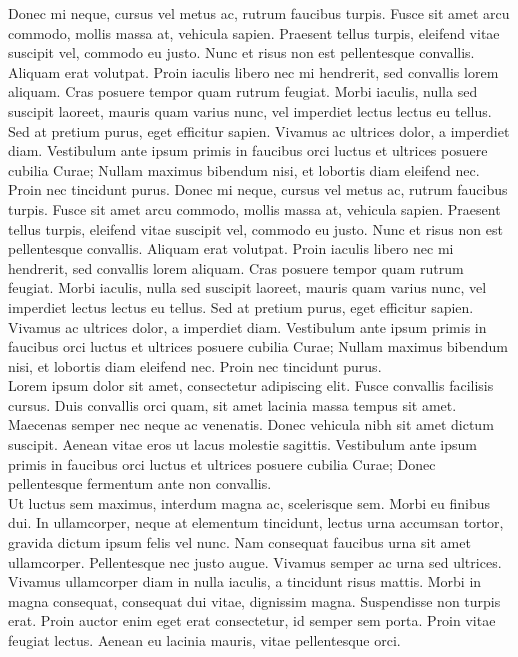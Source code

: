 Donec mi neque, cursus vel metus ac, rutrum faucibus turpis. Fusce sit amet arcu commodo, mollis massa at, vehicula sapien. Praesent tellus turpis, eleifend vitae suscipit vel, commodo eu justo. Nunc et risus non est pellentesque convallis. Aliquam erat volutpat. Proin iaculis libero nec mi hendrerit, sed convallis lorem aliquam. Cras posuere tempor quam rutrum feugiat. Morbi iaculis, nulla sed suscipit laoreet, mauris quam varius nunc, vel imperdiet lectus lectus eu tellus. Sed at pretium purus, eget efficitur sapien. Vivamus ac ultrices dolor, a imperdiet diam. Vestibulum ante ipsum primis in faucibus orci luctus et ultrices posuere cubilia Curae; Nullam maximus bibendum nisi, et lobortis diam eleifend nec. Proin nec tincidunt purus. 
Donec mi neque, cursus vel metus ac, rutrum faucibus turpis. Fusce sit amet arcu commodo, mollis massa at, vehicula sapien. Praesent tellus turpis, eleifend vitae suscipit vel, commodo eu justo. Nunc et risus non est pellentesque convallis. Aliquam erat volutpat. Proin iaculis libero nec mi hendrerit, sed convallis lorem aliquam. Cras posuere tempor quam rutrum feugiat. Morbi iaculis, nulla sed suscipit laoreet, mauris quam varius nunc, vel imperdiet lectus lectus eu tellus. Sed at pretium purus, eget efficitur sapien. Vivamus ac ultrices dolor, a imperdiet diam. Vestibulum ante ipsum primis in faucibus orci luctus et ultrices posuere cubilia Curae; Nullam maximus bibendum nisi, et lobortis diam eleifend nec. Proin nec tincidunt purus.
\\


Lorem ipsum dolor sit amet, consectetur adipiscing elit. Fusce convallis facilisis cursus. Duis convallis orci quam, sit amet lacinia massa tempus sit amet. Maecenas semper nec neque ac venenatis. Donec vehicula nibh sit amet dictum suscipit. Aenean vitae eros ut lacus molestie sagittis. Vestibulum ante ipsum primis in faucibus orci luctus et ultrices posuere cubilia Curae; Donec pellentesque fermentum ante non convallis.
\\

Ut luctus sem maximus, interdum magna ac, scelerisque sem. Morbi eu finibus dui. In ullamcorper, neque at elementum tincidunt, lectus urna accumsan tortor, gravida dictum ipsum felis vel nunc. Nam consequat faucibus urna sit amet ullamcorper. Pellentesque nec justo augue. Vivamus semper ac urna sed ultrices. Vivamus ullamcorper diam in nulla iaculis, a tincidunt risus mattis. Morbi in magna consequat, consequat dui vitae, dignissim magna. Suspendisse non turpis erat. Proin auctor enim eget erat consectetur, id semper sem porta. Proin vitae feugiat lectus. Aenean eu lacinia mauris, vitae pellentesque orci.
\\

